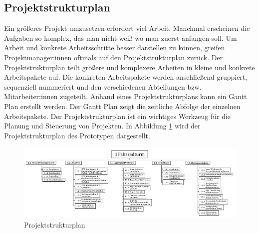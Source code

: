\subsection{Projektstrukturplan}

Ein größeres Projekt umzusetzen erfordert viel Arbeit. Manchmal erscheinen die Aufgaben so komplex, das man nicht weiß wo man zuerst anfangen soll. Um Arbeit und konkrete Arbeitsschritte besser darstellen zu können, greifen Projektmanager:innen oftmals auf den Projektstrukturplan zurück. Der Projektstrukturplan teilt größere und komplexere Arbeiten in kleine und konkrete Arbeitspakete auf. Die konkreten Arbeitspakete werden anschließend gruppiert, sequenziell nummeriert und den verschiedenen Abteilungen bzw. Mitarbeiter:innen zugeteilt. Anhand eines Projektstrukturplans kann ein Gantt Plan erstellt werden. Der Gantt Plan zeigt die zeitliche Abfolge der einzelnen Arbeitspakete. Der Projektstrukturplan ist ein wichtiges Werkzeug für die Planung und Steuerung von Projekten. In Abbildung \ref{fig:projektstrukturplan} wird der Projektstrukturplan des Prototypen dargestellt.

\begin{figure}[H]
  \centering
  \includegraphics[width=1\textwidth]{images/projektstrukturplan}
  \caption{Projektstrukturplan}
  \label{fig:projektstrukturplan}
\end{figure}

